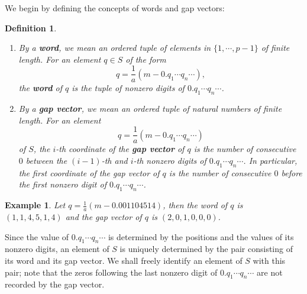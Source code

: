 \documentclass[english,oneside]{smfart}
\newtheorem{example}[theorem]{Example}
\newtheorem{definition}[theorem]{Definition}
\begin{document}
We begin by defining the concepts of words and gap vectors:
\begin{definition}\leavevmode
    \begin{enumerate}
        \item By a \textbf{word}, we mean an ordered tuple of elements in $\{1,\cdots,p-1\}$ of finite length. For an element $q\in S$ of the form
              $$q=\frac{1}{a}\left(m-0.q_1\cdots q_n\cdots\right),$$
              the \textbf{word} of $q$ is the tuple of nonzero digits of $0.q_1\cdots q_n\cdots$.
        \item By a \textbf{gap vector}, we mean an ordered tuple of natural numbers of finite length. For an element
              $$q=\frac{1}{a}\left(m-0.q_1\cdots q_n\cdots\right)$$
              of $S$, the $i$-th coordinate of the \textbf{gap vector} of $q$ is the number of consecutive $0$ between the $(i-1)$-th and $i$-th nonzero digits of $0.q_1\cdots q_n\cdots$. In particular, the first coordinate of the gap vector of $q$ is the number of consecutive $0$ before the first nonzero digit of $0.q_1\cdots q_n\cdots$.
    \end{enumerate}
\end{definition}
\begin{example}
    Let $q=\frac{1}{a}(m-0.001104514)$, then the word of $q$ is $(1,1,4,5,1,4)$ and the gap vector of $q$ is $(2,0,1,0,0,0)$.
\end{example}

Since the value of $0.q_1\cdots q_n\cdots$ is determined by the positions and the values of its nonzero digits, an element of $S$ is uniquely determined by the pair consisting of its word and its gap vector. We shall freely identify an element of $S$ with this pair; note that the zeros following the last nonzero digit of $0.q_1\cdots q_n\cdots$ are not recorded by the gap vector.
\end{document}

